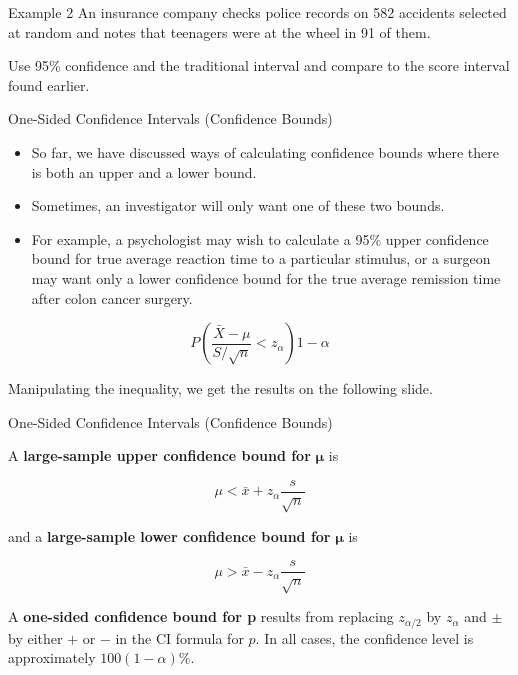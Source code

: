 \documentclass[
  ignorenonframetext,
]{beamer}
\providecommand{\tightlist}{%
  \setlength{\itemsep}{0pt}\setlength{\parskip}{0pt}}\usepackage{longtable,booktabs,array}
\begin{document}
\begin{frame}{Example 2}
\protect\hypertarget{example-2}{}
An insurance company checks police records on 582 accidents selected at
random and notes that teenagers were at the wheel in 91 of them.

Use 95\% confidence and the traditional interval and compare to the
score interval found earlier.
\end{frame}

\begin{frame}{One-Sided Confidence Intervals (Confidence Bounds)}
\protect\hypertarget{one-sided-confidence-intervals-confidence-bounds}{}
\begin{itemize}[<+->]
\tightlist
\item
  So far, we have discussed ways of calculating confidence bounds where
  there is both an upper and a lower bound.
\item
  Sometimes, an investigator will only want one of these two bounds.
\item
  For example, a psychologist may wish to calculate a 95\% upper
  confidence bound for true average reaction time to a particular
  stimulus, or a surgeon may want only a lower confidence bound for the
  true average remission time after colon cancer surgery.
\end{itemize}

\[
P\left( \frac{\bar{X} - \mu}{S/\sqrt{n}} < z_{\alpha}\right) 1 - \alpha
\]

Manipulating the inequality, we get the results on the following slide.
\end{frame}

\begin{frame}{One-Sided Confidence Intervals (Confidence Bounds)}
\protect\hypertarget{one-sided-confidence-intervals-confidence-bounds-1}{}
\begin{tcolorbox}[enhanced jigsaw, titlerule=0mm, colbacktitle=quarto-callout-important-color!10!white, opacityback=0, bottomrule=.15mm, colback=white, colframe=quarto-callout-important-color-frame, arc=.35mm, title=\textcolor{quarto-callout-important-color}{\faExclamation}\hspace{0.5em}{Proposition}, toprule=.15mm, breakable, coltitle=black, leftrule=.75mm, bottomtitle=1mm, left=2mm, rightrule=.15mm, toptitle=1mm, opacitybacktitle=0.6]

A \textbf{large-sample upper confidence bound for} \(\boldsymbol\mu\) is

\[
\mu < \bar{x} + z_{\alpha} \frac{s}{\sqrt{n}}
\]

and a \textbf{large-sample lower confidence bound for}
\(\boldsymbol\mu\) is

\[
\mu > \bar{x} - z_{\alpha} \frac{s}{\sqrt{n}}
\]

A \textbf{one-sided confidence bound for p} results from replacing
\(z_{\alpha/2}\) by \(z_{\alpha}\) and \(\pm\) by either \(+\) or \(-\)
in the CI formula for \(p\). In all cases, the confidence level is
approximately \(100(1-\alpha)\)\%.

\end{tcolorbox}
\end{frame}
\end{document}

